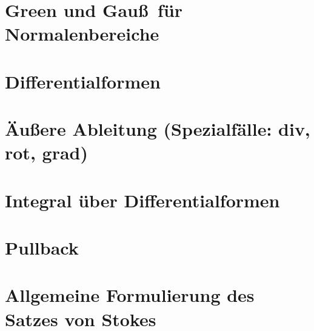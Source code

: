 \section{Green und Gau\ss \, f\"ur Normalenbereiche}

\section{Differentialformen}

\section{\"Au\ss ere Ableitung (Spezialf\"alle: div, rot, grad)}

\section{Integral \"uber Differentialformen}

\section{Pullback}

\section{Allgemeine Formulierung des Satzes von Stokes}